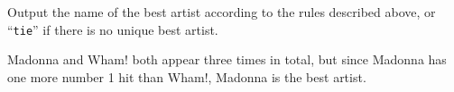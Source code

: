 \begin{Output}
    Output the name of the best artist according to the rules described above, or ``\texttt{tie}'' if there is no unique best artist.
\end{Output}

\nextsample
Madonna and Wham! both appear three times in total, but since Madonna has one more number 1 hit than Wham!, Madonna is the best artist.
